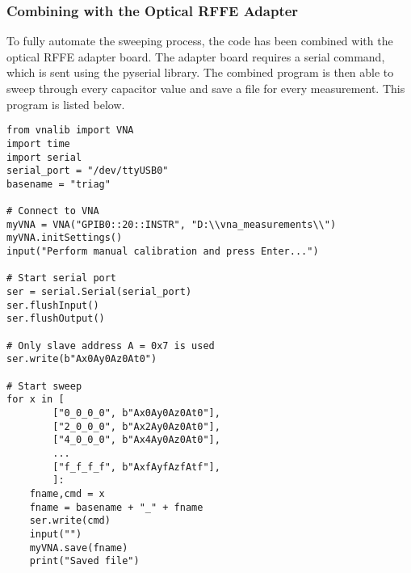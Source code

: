 \subsubsection{Combining with the Optical RFFE Adapter}
To fully automate the sweeping process, the code has been combined with the optical RFFE adapter board. The adapter board requires a serial command, which is sent using the pyserial library. The combined program is then able to sweep through every capacitor value and save a file for every measurement. This program is listed below. 
\begin{lstlisting}
from vnalib import VNA
import time
import serial
serial_port = "/dev/ttyUSB0"
basename = "triag"

# Connect to VNA
myVNA = VNA("GPIB0::20::INSTR", "D:\\vna_measurements\\")
myVNA.initSettings()
input("Perform manual calibration and press Enter...")

# Start serial port
ser = serial.Serial(serial_port)
ser.flushInput()
ser.flushOutput()

# Only slave address A = 0x7 is used
ser.write(b"Ax0Ay0Az0At0")

# Start sweep
for x in [
        ["0_0_0_0", b"Ax0Ay0Az0At0"],
        ["2_0_0_0", b"Ax2Ay0Az0At0"],
        ["4_0_0_0", b"Ax4Ay0Az0At0"],
        ...
        ["f_f_f_f", b"AxfAyfAzfAtf"],
        ]:
    fname,cmd = x
    fname = basename + "_" + fname
    ser.write(cmd)
    input("")
    myVNA.save(fname)
    print("Saved file")
\end{lstlisting}
